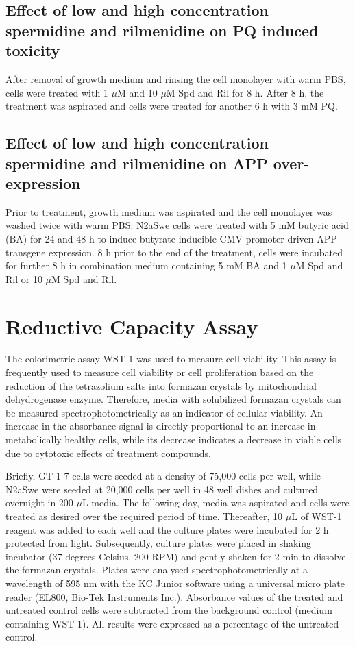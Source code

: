 \subsection{Effect of low and high concentration spermidine and rilmenidine on PQ induced toxicity}\label{sec:Effect_low_high_Spd_Ril_PQ_toxicity}
After removal of growth medium and rinsing the cell monolayer with warm PBS, cells were treated with 1 $\mu$M and 10 $\mu$M Spd and Ril for 8 h. After 8 h, the treatment was aspirated and cells were treated for another 6 h with 3 mM PQ. 

\subsection{Effect of low and high concentration spermidine and rilmenidine on APP over-expression}
Prior to treatment, growth medium was aspirated and the cell monolayer was washed twice with warm PBS. N2aSwe cells were treated with 5 mM butyric acid (BA) for 24 and 48 h to induce butyrate-inducible CMV promoter-driven APP transgene expression. 8 h prior to the end of the treatment, cells were incubated for further 8 h in combination medium containing 5 mM BA and 1 $\mu$M Spd and Ril or 10 $\mu$M Spd and Ril.

\section{Reductive Capacity Assay}
The colorimetric assay WST-1 was used to measure cell viability. This assay is frequently used to measure cell viability or cell proliferation based on the reduction of the tetrazolium salts into formazan crystals by mitochondrial dehydrogenase enzyme. Therefore, media with solubilized formazan crystals can be measured spectrophotometrically as an indicator of cellular viability. An increase in the absorbance signal is directly proportional to an increase in metabolically healthy cells, while its decrease indicates a decrease in viable cells due to cytotoxic effects of treatment compounds. 

Briefly, GT 1-7 cells were seeded at a density of 75,000 cells per well, while N2aSwe were seeded at 20,000 cells per well in 48 well dishes and cultured overnight in 200 $\mu$L media. The following day, media was aspirated and cells were treated as desired over the required period of time. Thereafter, 10 $\mu$L of WST-1 reagent was added to each well and the culture plates were incubated for 2 h protected from light. Subsequently, culture plates were placed in shaking incubator (37 degrees Celsius, 200 RPM) and gently shaken for 2 min to dissolve the formazan crystals. Plates were analysed spectrophotometrically at a wavelength of 595 nm with the KC Junior software using a universal micro plate reader (EL800, Bio-Tek Instruments Inc.). Absorbance values of the treated and untreated control cells were subtracted from the background control (medium containing WST-1). All results were expressed as a percentage of the untreated control.

